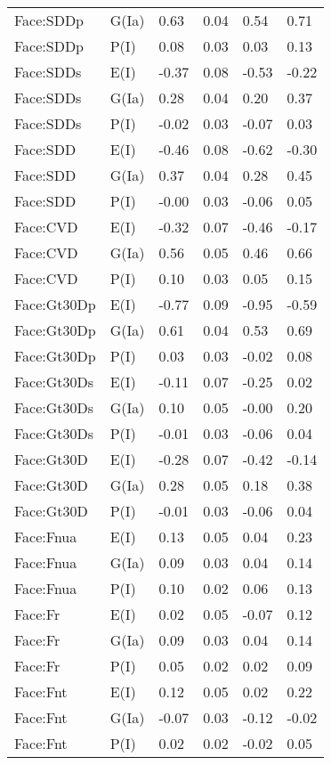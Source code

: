 \begin{center}
\begin{longtable}{|p{1.1in}|p{0.7in}|p{0.7in}|p{0.6in}|p{0.6in}|p{0.6in}|}
  Face:SDDp & G(Ia) & 0.63 & 0.04 & 0.54 & 0.71 \\ 
  Face:SDDp & P(I) & 0.08 & 0.03 & 0.03 & 0.13 \\ 
  Face:SDDs & E(I) & -0.37 & 0.08 & -0.53 & -0.22 \\ 
  Face:SDDs & G(Ia) & 0.28 & 0.04 & 0.20 & 0.37 \\ 
  Face:SDDs & P(I) & -0.02 & 0.03 & -0.07 & 0.03 \\ 
  Face:SDD & E(I) & -0.46 & 0.08 & -0.62 & -0.30 \\ 
  Face:SDD & G(Ia) & 0.37 & 0.04 & 0.28 & 0.45 \\ 
  Face:SDD & P(I) & -0.00 & 0.03 & -0.06 & 0.05 \\ 
  Face:CVD & E(I) & -0.32 & 0.07 & -0.46 & -0.17 \\ 
  Face:CVD & G(Ia) & 0.56 & 0.05 & 0.46 & 0.66 \\ 
  Face:CVD & P(I) & 0.10 & 0.03 & 0.05 & 0.15 \\ 
  Face:Gt30Dp & E(I) & -0.77 & 0.09 & -0.95 & -0.59 \\ 
  Face:Gt30Dp & G(Ia) & 0.61 & 0.04 & 0.53 & 0.69 \\ 
  Face:Gt30Dp & P(I) & 0.03 & 0.03 & -0.02 & 0.08 \\ 
  Face:Gt30Ds & E(I) & -0.11 & 0.07 & -0.25 & 0.02 \\ 
  Face:Gt30Ds & G(Ia) & 0.10 & 0.05 & -0.00 & 0.20 \\ 
  Face:Gt30Ds & P(I) & -0.01 & 0.03 & -0.06 & 0.04 \\ 
  Face:Gt30D & E(I) & -0.28 & 0.07 & -0.42 & -0.14 \\ 
  Face:Gt30D & G(Ia) & 0.28 & 0.05 & 0.18 & 0.38 \\ 
  Face:Gt30D & P(I) & -0.01 & 0.03 & -0.06 & 0.04 \\ 
  Face:Fnua & E(I) & 0.13 & 0.05 & 0.04 & 0.23 \\ 
  Face:Fnua & G(Ia) & 0.09 & 0.03 & 0.04 & 0.14 \\ 
  Face:Fnua & P(I) & 0.10 & 0.02 & 0.06 & 0.13 \\ 
  Face:Fr & E(I) & 0.02 & 0.05 & -0.07 & 0.12 \\ 
  Face:Fr & G(Ia) & 0.09 & 0.03 & 0.04 & 0.14 \\ 
  Face:Fr & P(I) & 0.05 & 0.02 & 0.02 & 0.09 \\ 
  Face:Fnt & E(I) & 0.12 & 0.05 & 0.02 & 0.22 \\ 
  Face:Fnt & G(Ia) & -0.07 & 0.03 & -0.12 & -0.02 \\ 
  Face:Fnt & P(I) & 0.02 & 0.02 & -0.02 & 0.05 \\ 

\end{longtable}
\end{center}
